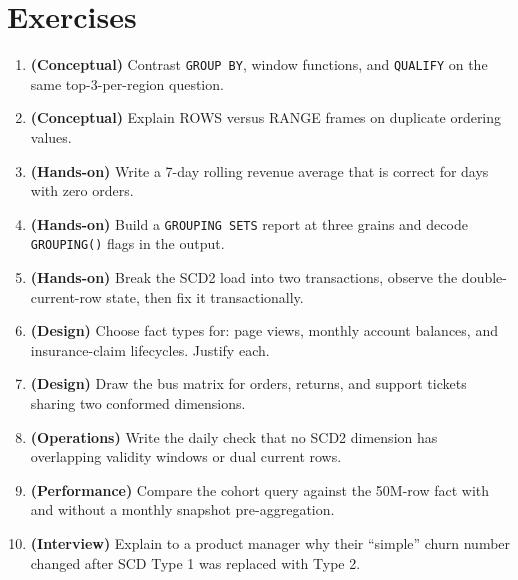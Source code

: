 \section{Exercises}
\begin{enumerate}
    \item \textbf{(Conceptual)} Contrast \texttt{GROUP BY}, window functions, and \texttt{QUALIFY} on the same top-3-per-region question.
    \item \textbf{(Conceptual)} Explain ROWS versus RANGE frames on duplicate ordering values.
    \item \textbf{(Hands-on)} Write a 7-day rolling revenue average that is correct for days with zero orders.
    \item \textbf{(Hands-on)} Build a \texttt{GROUPING SETS} report at three grains and decode \texttt{GROUPING()} flags in the output.
    \item \textbf{(Hands-on)} Break the SCD2 load into two transactions, observe the double-current-row state, then fix it transactionally.
    \item \textbf{(Design)} Choose fact types for: page views, monthly account balances, and insurance-claim lifecycles. Justify each.
    \item \textbf{(Design)} Draw the bus matrix for orders, returns, and support tickets sharing two conformed dimensions.
    \item \textbf{(Operations)} Write the daily check that no SCD2 dimension has overlapping validity windows or dual current rows.
    \item \textbf{(Performance)} Compare the cohort query against the 50M-row fact with and without a monthly snapshot pre-aggregation.
    \item \textbf{(Interview)} Explain to a product manager why their ``simple'' churn number changed after SCD Type 1 was replaced with Type 2.
\end{enumerate}

